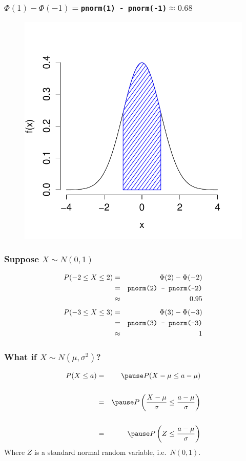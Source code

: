 \documentclass[handout]{beamer}
\begin{document}
\begin{frame}
\frametitle{$\Phi(1) - \Phi(-1) =$\texttt{pnorm(1) - pnorm(-1)}$\approx 0.68$}
\begin{figure}
\includegraphics[scale = 0.65]{./images/middle68_3}
\end{figure}
\end{frame}
\begin{frame}
\frametitle{Suppose $X \sim N(0,1)$}
\begin{eqnarray*}
	P(-2 \leq X \leq 2) &=& \Phi(2) - \Phi(-2) \\
		&=& \mbox{\texttt{pnorm(2) - pnorm(-2)}}\\
		&\approx& 0.95
\end{eqnarray*}
\pause
\begin{eqnarray*}
	P(-3 \leq X \leq 3) &=& \Phi(3) - \Phi(-3) \\
		&=& \mbox{\texttt{pnorm(3) - pnorm(-3)}}\\
		&\approx& 1
\end{eqnarray*}

\end{frame}
\begin{frame}
\frametitle{What if $X \sim N(\mu, \sigma^2)$?}
\begin{eqnarray*}
	P(X \leq a) &=& \pause P(X - \mu \leq a - \mu)\\\\
		&=& \pause P\left( \frac{X-\mu}{\sigma} \leq \frac{a - \mu}{\sigma} \right)\\\\
		&=&\pause  P\left(Z \leq  \frac{a - \mu}{\sigma}\right)
\end{eqnarray*}
Where $Z$ is a standard normal random variable, i.e.\ $N(0,1)$.
\end{frame}
\end{document}
